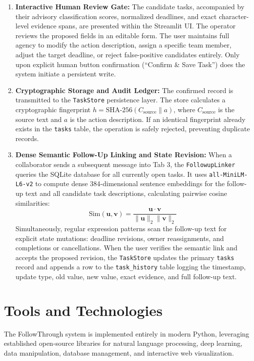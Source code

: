 \documentclass[conference]{IEEEtran}
\begin{document}
\begin{enumerate}
    \item \textbf{Interactive Human Review Gate:} The candidate tasks, accompanied by their advisory classification scores, normalized deadlines, and exact character-level evidence spans, are presented within the Streamlit UI. The operator reviews the proposed fields in an editable form. The user maintains full agency to modify the action description, assign a specific team member, adjust the target deadline, or reject false-positive candidates entirely. Only upon explicit human button confirmation (``Confirm \& Save Task'') does the system initiate a persistent write.
    \item \textbf{Cryptographic Storage and Audit Ledger:} The confirmed record is transmitted to the \texttt{TaskStore} persistence layer. The store calculates a cryptographic fingerprint $h = \text{SHA-256}(C_{\text{source}} \parallel a)$, where $C_{\text{source}}$ is the source text and $a$ is the action description. If an identical fingerprint already exists in the \texttt{tasks} table, the operation is safely rejected, preventing duplicate records.
    \item \textbf{Dense Semantic Follow-Up Linking and State Revision:} When a collaborator sends a subsequent message into Tab 3, the \texttt{FollowupLinker} queries the SQLite database for all currently open tasks. It uses \texttt{all-MiniLM-L6-v2} to compute dense 384-dimensional sentence embeddings for the follow-up text and all candidate task descriptions, calculating pairwise cosine similarities:
    \begin{equation}
        \text{Sim}(\mathbf{u}, \mathbf{v}) = \frac{\mathbf{u} \cdot \mathbf{v}}{\|\mathbf{u}\|_2 \|\mathbf{v}\|_2}
    \end{equation}
    Simultaneously, regular expression patterns scan the follow-up text for explicit state mutations: deadline revisions, owner reassignments, and completions or cancellations. When the user verifies the semantic link and accepts the proposed revision, the \texttt{TaskStore} updates the primary \texttt{tasks} record and appends a row to the \texttt{task\_history} table logging the timestamp, update type, old value, new value, exact evidence, and full follow-up text.
\end{enumerate}

\section{Tools and Technologies}
The FollowThrough system is implemented entirely in modern Python, leveraging established open-source libraries for natural language processing, deep learning, data manipulation, database management, and interactive web visualization.
\end{document}
